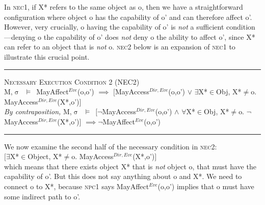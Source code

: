 \documentclass[a4paper,11pt, twoside,twocolumn]{article}
\newenvironment{logic}[1][null]
{\begin{flushleft} \small \label{#1}}
{\end{flushleft}}
\newcommand{\loin}{$\in$}
\newcommand{\loforall}{$\forall$}
\newcommand{\loexists}{$\exists$}
\newcommand{\loand}{$\land$}
\newcommand{\loor} {$\lor$}
\newcommand{\loneq} {$\neq$}
\newcommand{\loimplies}{$\implies$}
\newcommand{\losigma}{$\upsigma$}
\newcommand{\loturns} {$\vDash$}
\newcommand{\loneg}{$\boldsymbol \neg$}
\newcommand{\ablock} {\null\qquad}
\begin{document}
In \textsc{nec1}, if X* refers to the same object as o, then we have a straightforward configuration where object o has the capability of o' and can therefore affect o'. However, very crucially, o having the capability of o' is \textit{not} a sufficient condition---denying o the capability of o' does \textit{not} deny o the ability to affect o', since X* can refer to an object that is \textit{not} o. \textsc{nec2} below is an expansion of \textsc{nec1} to illustrate this crucial point.
\begin{logic}
\hrule\null
\textsc{\normalsize *Necessary Execution Condition 2 (NEC2)}\\
M,\losigma\ \loturns\ MayAffect$^{Eve}$(o,o') \loimplies\linebreak
	\ablock $[$MayAccess$^{Dir,Eve}$(o,o') \loor\linebreak
	\ablock \loexists X*\loin{Obj}, X*\loneq o. MayAccess$^{Dir,Eve}$(X*,o')$]$
\linebreak\\
\textit{By contraposition,}\linebreak
M,\losigma\ \loturns\ $[$\loneg MayAccess$^{Dir,Eve}$(o,o') \loand\linebreak
	\ablock \loforall X*\loin{Obj}, X*\loneq o. \loneg MayAccess$^{Dir,Eve}$(X*,o')$]$ \linebreak
	\ablock \loimplies\loneg MayAffect$^{Eve}$(o,o')\linebreak
\hrule
\end{logic}
We now examine the second half of the necessary condition in \textsc{nec2}:\\
$[$\loexists X*\loin{Object}, X*\loneq o. MayAccess$^{Dir,Eve}$(X*,o')$]$
\\ which means that there exists object X* that is \textit{not} object o, that must have the capability of o'. But this does not say anything about o and X*. We need to connect o to X*, because \textsc{npc1} says MayAffect$^{Eve}$(o,o') implies that o must have some indirect path to o'.
\end{document}
